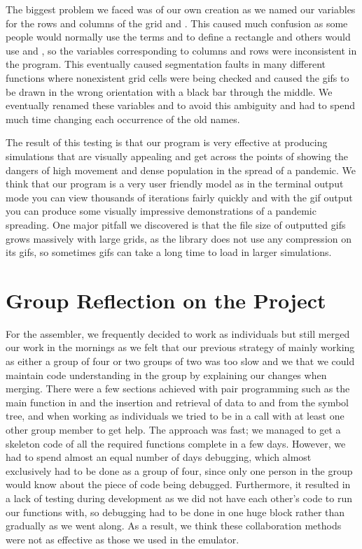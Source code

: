 \documentclass[11pt]{article}
\begin{document}
\par The biggest problem we faced was of our own creation as we named our variables for the rows and columns of the grid  and . 
This caused much confusion as some people would normally use the terms  and  to define a rectangle and others would use  and , so the variables corresponding to columns and rows were inconsistent in the program. 
This eventually caused segmentation faults in many different functions where nonexistent grid cells were being checked and caused the gifs to be drawn in the wrong orientation with a black bar through the middle. 
We eventually renamed these variables  and  to avoid this ambiguity and had to spend much time changing each occurrence of the old names.

\par The result of this testing is that our program is very effective at producing simulations that are visually appealing and get across the points of showing the dangers of high movement and dense population in the spread of a pandemic. 
We think that our program is a very user friendly model as in the terminal output mode you can view thousands of iterations fairly quickly and with the gif output you can produce some visually impressive demonstrations of a pandemic spreading. 
One major pitfall we discovered is that the file size of outputted gifs grows massively with large grids, as the  library does not use any compression on its gifs, so sometimes gifs can take a long time to load in larger simulations.

\section{Group Reflection on the Project}
For the assembler, we frequently decided to work as individuals but still merged our work in the mornings as we felt that our previous strategy of mainly working as either a group of four or two groups of two was too slow and we that we could maintain code understanding in the group by explaining our changes when merging. 
There were a few sections achieved with pair programming such as the main function in  and the insertion and retrieval of data to and from the symbol tree, and when working as individuals we tried to be in a call with at least one other group member to get help.
The approach was fast; we managed to get a skeleton code of all the required functions complete in a few days.
However, we had to spend almost an equal number of days debugging, which almost exclusively had to be done as a group of four, since only one person in the group would know about the piece of code being debugged.
Furthermore, it resulted in a lack of testing during development as we did not have each other’s code to run our functions with, so debugging had to be done in one huge block rather than gradually as we went along.
As a result, we think these collaboration methods were not as effective as those we used in the emulator. 
\end{document}
